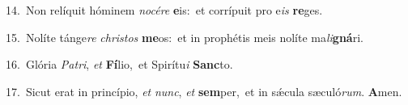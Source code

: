 {\numbfont\textcolor{\numbcolor}{14.}}~Non relíquit hóminem \textit{no}\-\textit{cé}\textit{re} \textbf{e}\-is:~\star et corrípuit pro e\textit{is} \textbf{re}\-ges.\par
{\numbfont\textcolor{\numbcolor}{15.}}~Nolíte tánge\textit{re} \textit{chris}\-\textit{tos} \textbf{me}\-os:~\star et in prophétis meis nolíte ma\-\textit{li}\-\textbf{gná}ri.\par
{\numbfont\textcolor{\numbcolor}{16.}}~Glória \textit{Pa}\-\textit{tri}, \textit{et} \textbf{Fí}\-lio,~\star et Spirítu\textit{i} \textbf{Sanc}\-to.\par
{\numbfont\textcolor{\numbcolor}{17.}}~Sicut erat in princípio, \textit{et} \textit{nunc}\-, \textit{et} \textbf{sem}\-per,~\star et in sǽcula sæculó\-\textit{rum}\-. \textbf{A}\-men.\par
